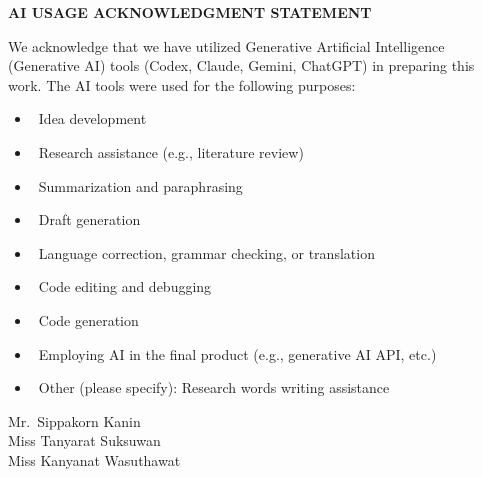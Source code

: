 \documentclass[11pt]{article}
\newcommand{\checkedbox}{\makebox[0pt][l]{$\square$}\raisebox{.15ex}{\hspace{0.1em}$\checkmark$}}
\begin{document}
\clearpage
{}
\begin{center}
{\large\bfseries AI USAGE ACKNOWLEDGMENT STATEMENT}
\end{center}
\vspace{0.6cm}

{\linespread{1.5}\selectfont
\setlength{\parindent}{2.5em}
We acknowledge that we have utilized Generative Artificial Intelligence (Generative AI) tools (Codex, Claude, Gemini, ChatGPT) in preparing this work. The AI tools were used for the following purposes:\par}

\vspace{0.4cm}
\begin{itemize}[label={}, leftmargin=0pt, itemsep=10pt]
  \item \checkedbox\ Idea development
  \item \checkedbox\ Research assistance (e.g., literature review)
  \item \checkedbox\ Summarization and paraphrasing
  \item \checkedbox\ Draft generation
  \item \checkedbox\ Language correction, grammar checking, or translation
  \item \checkedbox\ Code editing and debugging
  \item \checkedbox\ Code generation
  \item \checkedbox\ Employing AI in the final product (e.g., generative AI API, etc.)
  \item \checkedbox\ Other (please specify): Research words writing assistance
\end{itemize}

\vspace{1cm}
\begin{flushright}
{\large
Mr.\ Sippakorn Kanin\\[8pt]
Miss Tanyarat Suksuwan\\[8pt]
Miss Kanyanat Wasuthawat\par}
\end{flushright}
\end{document}
